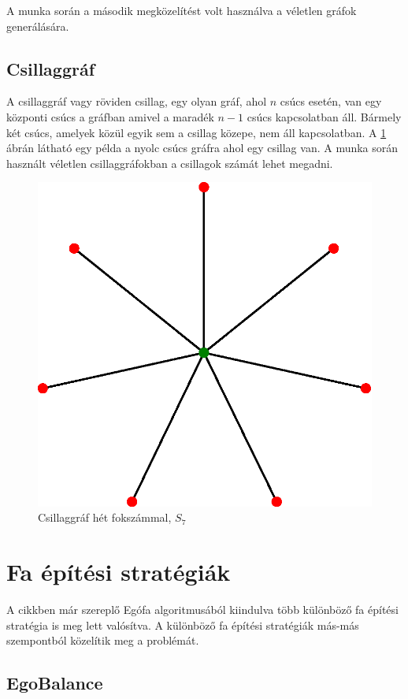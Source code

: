 \documentclass[12pt]{report}
\begin{document}
A munka során a második megközelítést volt használva a véletlen gráfok generálására.

\subsection{Csillaggráf}

A csillaggráf vagy röviden csillag, egy olyan gráf, ahol \(n\) csúcs esetén, van egy központi csúcs a gráfban amivel a maradék \(n-1\) csúcs kapcsolatban áll.
Bármely két csúcs, amelyek közül egyik sem a csillag közepe, nem áll kapcsolatban.
A \ref{star} ábrán látható egy példa a nyolc csúcs gráfra ahol egy csillag van.
A munka során használt véletlen csillaggráfokban a csillagok számát lehet megadni.

\begin{figure}[H]
	\begin{center}
		\includegraphics[width=0.4\linewidth]{pictures/Star_network_7.eps}
		\caption{Csillaggráf hét fokszámmal, \(S_7\) \cite{wikipedia_csillag}}
		\label{star}
	\end{center}
\end{figure}

\section{Fa építési stratégiák}

A cikkben \cite{avin_demand-aware_nodate} már szereplő Egófa algoritmusából kiindulva több különböző fa építési stratégia is meg lett valósítva.
A különböző fa építési stratégiák más-más szempontból közelítik meg a problémát.

\subsection{EgoBalance}
\end{document}
